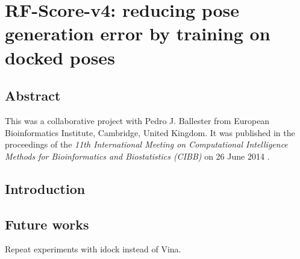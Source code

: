 \chapter{RF-Score-v4: reducing pose generation error by training on docked poses}

\section{Abstract}

This was a collaborative project with Pedro J. Ballester from European Bioinformatics Institute, Cambridge, United Kingdom. It was published in the proceedings of the \textit{11th International Meeting on Computational Intelligence Methods for Bioinformatics and Biostatistics (CIBB)} on 26 June 2014 \citep{1434}.

\section{Introduction}



\section{Future works}

Repeat experiments with idock instead of Vina.

\chapterend
